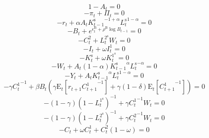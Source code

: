 \begin{equation}
1 - A_{t} = 0
\end{equation}
\begin{equation}
-\pi_{t} + \Pi_{t} = 0
\end{equation}
\begin{equation}
-r_{t} + {\alpha} {A_{t}} {{K^{\mathrm{s}}_{t-1}}^{-1 + \alpha}} {{L^{\mathrm{s}}_{t}}^{1 - \alpha}} = 0
\end{equation}
\begin{equation}
-B_{t} + e^{\epsilon^{\mathrm{B}}_{t} + {\rho^{\mathrm{B}}} {\log{B_{t-1}}}} = 0
\end{equation}
\begin{equation}
-C^{\mathrm{2}}_{t} + {L^{\mathrm{2}^{\mathrm{s}}}_{t}} {W_{t}} = 0
\end{equation}
\begin{equation}
-I_{t} + {\omega} {I^{\mathrm{1}}_{t}} = 0
\end{equation}
\begin{equation}
-K^{\mathrm{s}}_{t} + {\omega} {K^{\mathrm{1}^{\mathrm{s}}}_{t}} = 0
\end{equation}
\begin{equation}
-W_{t} + {A_{t}} \left(1 - \alpha\right) {{K^{\mathrm{s}}_{t-1}}^{\alpha}} {{L^{\mathrm{s}}_{t}}^{-\alpha}} = 0
\end{equation}
\begin{equation}
-Y_{t} + {A_{t}} {{K^{\mathrm{s}}_{t-1}}^{\alpha}} {{L^{\mathrm{s}}_{t}}^{1 - \alpha}} = 0
\end{equation}
\begin{equation}
-{\gamma} {C^{\mathrm{1}}_{t}}^{-1} + {\beta} {B_{t}} \left({\gamma} {\mathrm{E}_{t}\left[{r_{t+1}} {C^{\mathrm{1}}_{t+1}}^{-1}\right]} + {\gamma} \left(1 - \delta\right) {\mathrm{E}_{t}\left[{C^{\mathrm{1}}_{t+1}}^{-1}\right]}\right) = 0
\end{equation}
\begin{equation}
-\left(1 - \gamma\right) \left(1 - L^{\mathrm{1}^{\mathrm{s}}}_{t}\right)^{-1} + {\gamma} {C^{\mathrm{1}}_{t}}^{-1} {W_{t}} = 0
\end{equation}
\begin{equation}
-\left(1 - \gamma\right) \left(1 - L^{\mathrm{2}^{\mathrm{s}}}_{t}\right)^{-1} + {\gamma} {C^{\mathrm{2}}_{t}}^{-1} {W_{t}} = 0
\end{equation}
\begin{equation}
-C_{t} + {\omega} {C^{\mathrm{1}}_{t}} + {C^{\mathrm{2}}_{t}} \left(1 - \omega\right) = 0
\end{equation}
